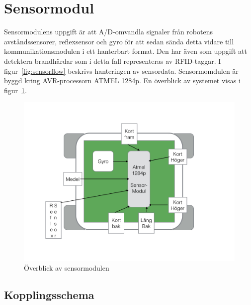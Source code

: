 \documentclass[a4paper,12pt,fleqn]{article}
\begin{document}
\newpage



\section{Sensormodul}
Sensormodulens uppgift är att A/D-omvandla signaler från robotens avståndssensorer, reflexsensor och gyro för att sedan sända detta vidare till kommunikationsmodulen i ett hanterbart format. Den har även som uppgift att detektera brandhärdar som i detta fall representeras av RFID-taggar. I figur~\ref{fig:sensorflow} beskrivs hanteringen av sensordata. Sensormomdulen är byggd kring AVR-processorn ATMEL 1284p. En överblick av systemet visas i figur~\ref{fig:sensoroverview}.

\begin{figure}[htp] %
  \begin{center}
  \includegraphics[keepaspectratio=true,width=\linewidth]{bilder/overblicksensor}  %
  \end{center}
  \caption{Överblick av sensormodulen} %
  \label{fig:sensoroverview}
\end{figure}

\subsection{Kopplingsschema}
\end{document}
